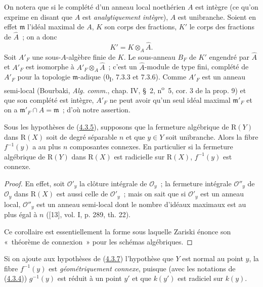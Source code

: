 On notera que si le complété d'un anneau local noethérien $A$ est intègre
(ce qu'on exprime en disant que $A$ est \emph{analytiquement intègre}), $A$
est unibranche. Soient en effet $\mathfrak m$ l'idéal maximal de $A$, $K$
son corps des fractions, $K'$ le corps des fractions de $\widehat A$~; on
a donc
\[
K'=K\otimes_A\widehat A.
\]
Soit $A'_F$ une sous-$A$-algèbre finie de $K$. Le sous-anneau $B_F$ de $K'$
engendré par $\widehat A$ et $A'_F$ est isomorphe à
$A'_F\otimes_A\widehat A$~; c'est un $\widehat A$-module de type fini,
complété de $A'_F$ pour la topologie $\mathfrak m$-adique
(0\textsubscript{I}, 7.3.3 et 7.3.6). Comme $A'_F$ est un anneau semi-local
(Bourbaki, \emph{Alg. comm.}, chap. IV, \S~2, n\textsuperscript{o}~5,
cor. 3 de la prop. 9) et que son complété est intègre, $A'_F$ ne peut avoir
qu'un seul idéal maximal $\mathfrak m'_F$ et on a
$\mathfrak m'_F\cap A=\mathfrak m$~; d'où notre assertion.

\begin{corollary}[4.3.7]
\label{III.4.3.7-fr}
Sous les hypothèses de (\hyperref[III.4.3.5-fr]{4.3.5}), supposons que la
fermeture algébrique de $\mathrm R(Y)$ dans $\mathrm R(X)$ soit de degré
séparable $n$ et que $y\in Y$ soit unibranche. Alors la fibre $f^{-1}(y)$ a
au plus $n$ composantes connexes. En particulier si la fermeture algébrique
de $\mathrm R(Y)$ dans $\mathrm R(X)$ est radicielle sur $\mathrm R(X)$,
$f^{-1}(y)$ est connexe.
\end{corollary}

\begin{proof}
En effet, soit $\mathcal O'_y$ la clôture intégrale de $\mathcal O_y$~; la
fermeture intégrale $\mathcal O''_y$ de $\mathcal O_y$ dans $\mathrm R(X)$
est aussi celle de $\mathcal O'_y$~; mais on sait que si $\mathcal O'_y$ est
un anneau local, $\mathcal O''_y$ est un anneau semi-local dont le nombre
d'idéaux maximaux est au plus égal à $n$ ([13], vol. I, p. 289, th. 22).

Ce corollaire est essentiellement la forme sous laquelle Zariski énonce son
«~théorème de connexion~» pour les schémas algébriques.
\end{proof}

\begin{remark}[4.3.8]
\label{III.4.3.8-fr}
Si on ajoute aux hypothèses de (\hyperref[III.4.3.7-fr]{4.3.7}) l'hypothèse
que $Y$ est normal au point $y$, la fibre $f^{-1}(y)$ est
\emph{géométriquement connexe}, puisque (avec les notations de
(\hyperref[III.4.3.4-fr]{4.3.4})) $g^{-1}(y)$ est réduit à un point $y'$ et
que $k(y')$ est radiciel sur $k(y)$.
\end{remark}

